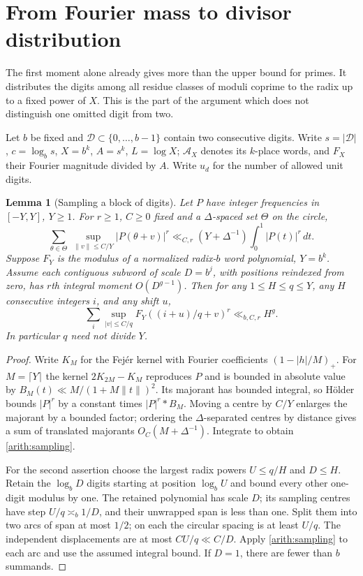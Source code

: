 \documentclass[11pt,a4paper]{article}
\theoremstyle{paperplain}
\newtheorem{lemma}[theorem]{Lemma}
\numberwithin{equation}{section}
\begin{document}
\section{From Fourier mass to divisor distribution}\label{common:divisors}
The first moment alone already gives more than the upper bound for
primes. It distributes the digits among all residue classes of
moduli coprime to the radix up to a fixed power of $X$. This is the part
of the argument which does not distinguish one omitted digit from two.

Let $b$ be fixed and $\mathcal D\subset\{0,\ldots,b-1\}$ contain
two consecutive digits. Write $s=|\mathcal D|$, $c=\log_b s$,
$X=b^k$, $A=s^k$, $L=\log X$; $\mathcal A_X$ denotes its $k$-place
words, and $F_X$ their Fourier magnitude divided by $A$. Write
$u_d$ for the number of allowed unit digits.

\begin{lemma}[Sampling a block of digits]\label{common:sampling}
Let $P$ have integer frequencies in $[-Y,Y]$, $Y\ge1$. For
$r\ge1$, $C\ge0$ fixed and a $\Delta$-spaced set $\Theta$ on the circle,
\begin{equation}\label{arith:sampling}
 \sum_{\theta\in\Theta}\ \sup_{\|v\|\le C/Y}|P(\theta+v)|^r
 \ll_{C,r}(Y+\Delta^{-1})\int_0^1 |P(t)|^r\,dt .
\end{equation}
Suppose $F_Y$ is the modulus of a normalized radix-$b$ word polynomial,
$Y=b^k$. Assume each contiguous subword of scale $D=b^j$, with
positions reindexed from zero, has $r$th integral moment $O(D^{g-1})$.
Then for any $1\le H\le q\le Y$, any $H$ consecutive integers $i$,
and any shift $u$,
\[
 \sum_i\sup_{|v|\le C/q} F_Y((i+u)/q+v)^r\ll_{b,C,r}H^g .
\]
In particular $q$ need not divide $Y$.
\end{lemma}
\begin{proof}
Write $K_M$ for the Fej\'er kernel with Fourier coefficients
$(1-|h|/M)_+$. For $M=\lceil Y\rceil$ the kernel $2K_{2M}-K_M$
reproduces $P$ and is bounded in absolute value by
$B_M(t)\ll M/(1+M\|t\|)^2$. Its majorant has bounded integral,
so H\"older bounds $|P|^r$ by a constant times $|P|^r*B_M$.
Moving a centre by $C/Y$ enlarges the majorant by a bounded factor;
ordering the $\Delta$-separated centres by distance gives a sum of
translated majorants $O_C(M+\Delta^{-1})$. Integrate to obtain
\eqref{arith:sampling}.

For the second assertion choose the largest radix powers $U\le q/H$
and $D\le H$. Retain the $\log_b D$ digits starting at position
$\log_b U$ and bound every other one-digit modulus by one. The
retained polynomial has scale $D$; its sampling centres have step
$U/q\asymp_b 1/D$, and their unwrapped span is less than one.
Split them into two arcs of span at most $1/2$; on each the circular
spacing is at least $U/q$. The independent displacements are at most
$CU/q\ll C/D$. Apply \eqref{arith:sampling} to each arc and use the
assumed integral bound. If $D=1$, there are fewer than $b$ summands.
\end{proof}
\end{document}
